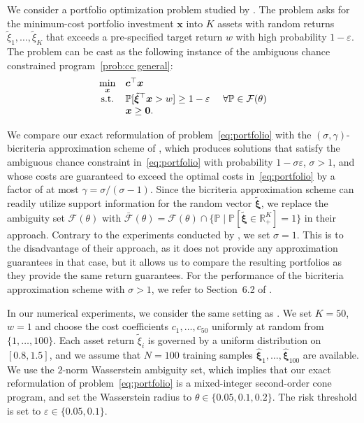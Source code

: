 \documentclass[nonblindrev]{informs2017}
\newcommand{\bmt}[1]{\tilde{\bm{#1}}}
\newcommand{\bmh}[1]{\hat{\bm{#1}}}
\newcommand{\1}[1]{\mathds{1}{\left(#1\right)}}
\begin{document}
We consider a portfolio optimization problem studied by \cite{xie2018bicriteria}. The problem asks for the minimum-cost portfolio investment $\bm{x}$ into $K$ assets with random returns $\tilde{\xi}_1, \ldots, \tilde{\xi}_K$ that exceeds a pre-specified target return $w$ with high probability $1 - \varepsilon$. The problem can be cast as the following instance of the ambiguous chance constrained program~\eqref{prob:cc general}:
\begin{equation}\label{eq:portfolio}
\begin{array}{cll}
\displaystyle \min_{\bm{x}} & \bm{c}^\top\bm{x} \\
{\rm s.t.} &\displaystyle \mathbb{P}[\bmt{\xi}^\top\bm{x} > w] \geq 1-\varepsilon &~\forall \mathbb{P} \in \mathcal{F}(\theta)\\
&\bm{x} \geq \bm{0}.
\end{array}
\end{equation}

We compare our exact reformulation of problem~\eqref{eq:portfolio} with the $(\sigma, \gamma)$-bicriteria approximation scheme of \cite{xie2018bicriteria}, which produces solutions that satisfy the ambiguous chance constraint in~\eqref{eq:portfolio} with probability $1 - \sigma \varepsilon$, $\sigma > 1$, and whose costs are guaranteed to exceed the optimal costs in~\eqref{eq:portfolio} by a factor of at most $\gamma = \sigma / (\sigma - 1)$. Since the bicriteria approximation scheme can readily utilize support information for the random vector $\bmt{\xi}$, we replace the ambiguity set $\mathcal{F}(\theta)$ with $\bar{\mathcal{F}}(\theta) = \mathcal{F}(\theta) \cap \{\mathbb{P} \mid \mathbb{P}[\bmt{\xi} \in \mathbb{R}^K_+] = 1\}$ in their approach. Contrary to the experiments conducted by \cite{xie2018bicriteria}, we set $\sigma = 1$. This is to the disadvantage of their approach, as it does not provide any approximation guarantees in that case, but it allows us to compare the resulting portfolios as they provide the same return guarantees. For the performance of the bicriteria approximation scheme with $\sigma > 1$, we refer to Section~6.2 of \cite{xie2018bicriteria}.

In our numerical experiments, we consider the same setting as \cite{xie2018bicriteria}. We set $K = 50$, $w = 1$ and choose the cost coefficients $c_1, \ldots, c_{50}$ uniformly at random from $\{ 1, \ldots, 100 \}$. Each asset return $\tilde{\xi}_i$ is governed by a uniform distribution on $[0.8, 1.5]$, and we assume that $N = 100$ training samples $\bmh{\xi}_1, \ldots, \bmh{\xi}_{100}$ are available. We use the $2$-norm Wasserstein ambiguity set, which implies that our exact reformulation of problem~\eqref{eq:portfolio} is a mixed-integer second-order cone program, and set the Wasserstein radius to $\theta \in  \{0.05, 0.1, 0.2\}$. The risk threshold is set to $\varepsilon \in \{0.05, 0.1\}$.
\end{document}
